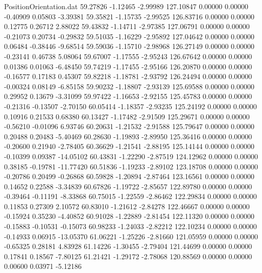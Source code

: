 \begin{filecontents}{PositionOrientation.dat}
  59.27826   -1.12465   -2.99989   127.10847    0.00000    0.00000   -0.40909    0.05803   -3.39381
  59.35821   -1.15735   -2.99525   126.83716    0.00000    0.00000    0.12775    0.26712    2.88022
  59.43832   -1.14711   -2.97385   127.06791    0.00000    0.00000   -0.21073    0.20734   -0.29832
  59.51035   -1.16229   -2.95892   127.04642    0.00000    0.00000    0.06484   -0.38446   -9.68514
  59.59036   -1.15710   -2.98968   126.27149    0.00000    0.00000   -0.23141    0.46738    5.08064
  59.67007   -1.17555   -2.95243   126.67642    0.00000    0.00000    0.01386    0.01063   -6.48450
  59.74219   -1.17455   -2.95166   126.20870    0.00000    0.00000   -0.16577    0.17183    0.45307
  59.82218   -1.18781   -2.93792   126.24494    0.00000    0.00000   -0.00324    0.08149   -6.85158
  59.90232   -1.18807   -2.93139   125.69588    0.00000    0.00000    0.29952    0.13679   -3.31099
  59.97422   -1.16653   -2.92155   125.45783    0.00000    0.00000   -0.21316   -0.13507   -2.70150
  60.05414   -1.18357   -2.93235   125.24192    0.00000    0.00000    0.10916    0.21533    0.68380
  60.13427   -1.17482   -2.91509   125.29671    0.00000    0.00000   -0.56210   -0.01096    6.93746
  60.20631   -1.21532   -2.91588   125.79647    0.00000    0.00000    0.20488    0.20483   -5.40469
  60.28630   -1.19893   -2.89950   125.36416    0.00000    0.00000   -0.20600    0.21940   -2.78405
  60.36629   -1.21541   -2.88195   125.14144    0.00000    0.00000   -0.10399    0.09387  -14.05102
  60.43831   -1.22290   -2.87519   124.12962    0.00000    0.00000    0.38185   -0.19781  -11.77420
  60.51836   -1.19233   -2.89102   123.18708    0.00000    0.00000   -0.20786    0.20499   -0.26868
  60.59828   -1.20894   -2.87464   123.16561    0.00000    0.00000    0.14652    0.22588   -3.34839
  60.67826   -1.19722   -2.85657   122.89780    0.00000    0.00000   -0.39464   -0.11191   -8.33868
  60.75015   -1.22559   -2.86462   122.29834    0.00000    0.00000    0.11853    0.27309    2.10572
  60.83010   -1.21612   -2.84278   122.46667    0.00000    0.00000   -0.15924    0.35230   -4.40852
  60.91028   -1.22889   -2.81454   122.11320    0.00000    0.00000   -0.15883   -0.10531   -0.15073
  60.98233   -1.24033   -2.82212   122.10234    0.00000    0.00000   -0.14933    0.06915  -13.05370
  61.06221   -1.25226   -2.81660   121.05959    0.00000    0.00000   -0.65325    0.28181    4.83928
  61.14226   -1.30455   -2.79404   121.44699    0.00000    0.00000    0.17841    0.18567   -7.80125
  61.21421   -1.29172   -2.78068   120.88569    0.00000    0.00000    0.00600    0.03971   -5.12186

\end{filecontents}
